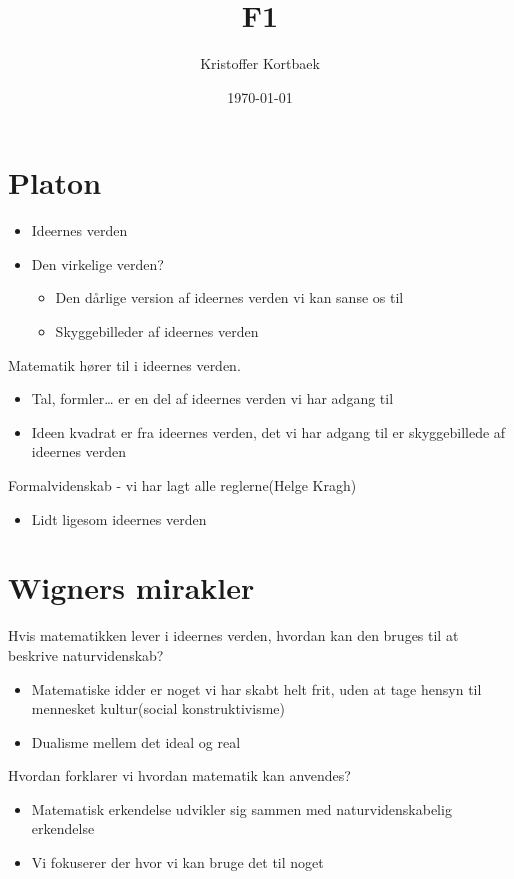 \documentclass[11pt]{article}
\author{Kristoffer Kortbaek}
\date{\today}
\title{F1}
\begin{document}
\maketitle
\tableofcontents


\section{Platon}
\label{sec:org78b1cce}
\begin{itemize}
\item Ideernes verden
\item Den virkelige verden?
\begin{itemize}
\item Den dårlige version af ideernes verden vi kan sanse os til
\item Skyggebilleder af ideernes verden
\end{itemize}
\end{itemize}

Matematik hører til i ideernes verden.
\begin{itemize}
\item Tal, formler\ldots{} er en del af ideernes verden vi har adgang til
\item Ideen kvadrat er fra ideernes verden, det vi har adgang til er skyggebillede af ideernes verden
\end{itemize}

Formalvidenskab - vi har lagt alle reglerne(Helge Kragh)
\begin{itemize}
\item Lidt ligesom ideernes verden
\end{itemize}

\section{Wigners mirakler}
\label{sec:org493764e}
Hvis matematikken lever i ideernes verden, hvordan kan den bruges til at beskrive naturvidenskab?
\begin{itemize}
\item Matematiske idder er noget vi har skabt helt frit, uden at tage hensyn til
mennesket kultur(social konstruktivisme)
\item Dualisme mellem det ideal og real
\end{itemize}

Hvordan forklarer vi hvordan matematik kan anvendes?
\begin{itemize}
\item Matematisk erkendelse udvikler sig sammen med naturvidenskabelig erkendelse
\item Vi fokuserer der hvor vi kan bruge det til noget
\end{itemize}
\end{document}
